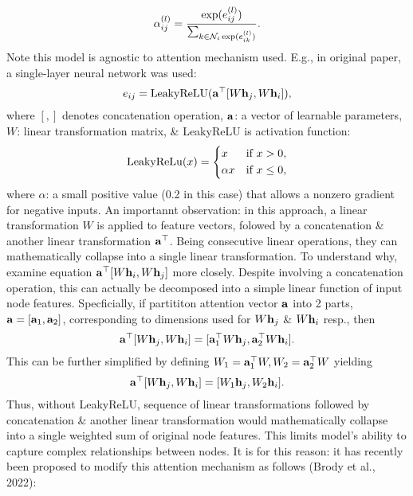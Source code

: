 \documentclass{article}
\begin{document}
\begin{itemize}
\begin{itemize}
\begin{itemize}
\begin{equation*}
                \alpha_{ij}^{(l)} = \frac{\exp(e_{ij}^{(l)})}{\sum_{k\in{\cal N}_i \exp(e_{ik}^{(l)})}}.
            \end{equation*}
            Note this model is agnostic to attention mechanism used. E.g., in original paper, a single-layer neural network was used:
            \begin{equation*}
                e_{ij} = {\rm LeakyReLU}({\bf a}^\top[W{\bf h}_j,W{\bf h}_i]),
            \end{equation*}
            where $[,]$ denotes concatenation operation, ${\bf a}$: a vector of learnable parameters, $W$: linear transformation matrix, \& LeakyReLU is activation function:
            \begin{equation*}
                {\rm LeakyReLu}(x) = \left\{\begin{split}
                    &x&&\mbox{if } x > 0,\\
                    &\alpha x&&\mbox{if } x\le0,
                \end{split}\right.
            \end{equation*}
            where $\alpha$: a small positive value (0.2 in this case) that allows a nonzero gradient for negative inputs. An importannt observation: in this approach, a linear transformation $W$ is applied to feature vectors, folowed by a concatenation \& another linear transformation ${\bf a}^\top$. Being consecutive linear operations, they can mathematically collapse into a single linear transformation. To understand why, examine equation ${\bf a}^\top[W{\bf h}_i,W{\bf h}_j]$ more closely. Despite involving a concatenation operation, this can actually be decomposed into a simple linear function of input node features. Specficially, if partititon attention vector ${\bf a}$ into 2 parts, ${\bf a} = [{\bf a}_1,{\bf a}_2]$, corresponding to dimensions used for $W{\bf h}_j$ \& $W{\bf h}_i$ resp., then
            \begin{equation*}
                {\bf a}^\top[W{\bf h}_j,W{\bf h}_i] = [{\bf a}_1^\top W{\bf h}_j,{\bf a}_2^\top W{\bf h}_i].
            \end{equation*}
            This can be further simplified by defining $W_1 = {\bf a}_1^\top W,W_2 = {\bf a}_2^\top W$ yielding
            \begin{equation*}
                {\bf a}^\top[W{\bf h}_j,W{\bf h}_i] = [W_1{\bf h}_j,W_2{\bf h}_i].
            \end{equation*}
            Thus, without LeakyReLU, sequence of linear transformations followed by concatenation \& another linear transformation would mathematically collapse into a single weighted sum of original node features. This limits model's ability to capture complex relationships between nodes. It is for this reason: it has recently been proposed to modify this attention mechanism as follows (Brody et al., 2022):

\end{itemize}
\end{itemize}
\end{itemize}
\end{document}
